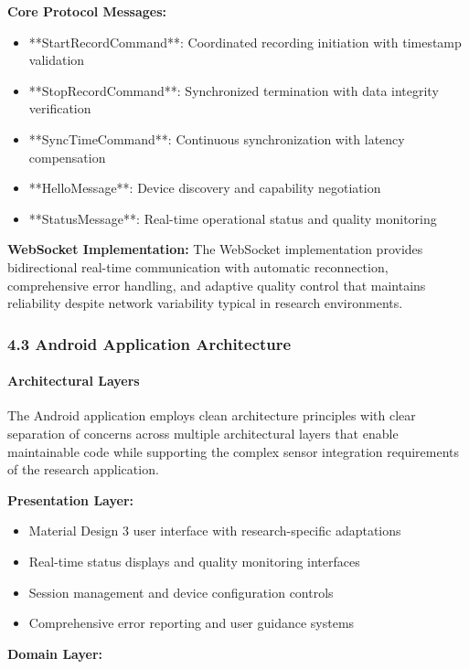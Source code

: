 \documentclass[12pt,a4paper]{report}
\begin{document}
\textbf{Core Protocol Messages:}

\begin{itemize}
\item **StartRecordCommand**: Coordinated recording initiation with timestamp validation
\item **StopRecordCommand**: Synchronized termination with data integrity verification
\item **SyncTimeCommand**: Continuous synchronization with latency compensation
\item **HelloMessage**: Device discovery and capability negotiation
\item **StatusMessage**: Real-time operational status and quality monitoring

\end{itemize}
\textbf{WebSocket Implementation:}
The WebSocket implementation provides bidirectional real-time communication with automatic reconnection, comprehensive
error handling, and adaptive quality control that maintains reliability despite network variability typical in research
environments.

\subsubsection{4.3 Android Application Architecture}

\paragraph{Architectural Layers}

The Android application employs clean architecture principles with clear separation of concerns across multiple
architectural layers that enable maintainable code while supporting the complex sensor integration requirements of the
research application.

\textbf{Presentation Layer:}

\begin{itemize}
\item Material Design 3 user interface with research-specific adaptations
\item Real-time status displays and quality monitoring interfaces
\item Session management and device configuration controls
\item Comprehensive error reporting and user guidance systems

\end{itemize}
\textbf{Domain Layer:}
\end{document}
